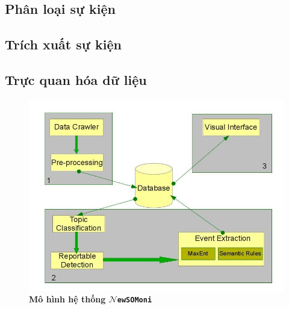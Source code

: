 \subsection{Phân loại sự kiện}
\label{classifi}

\subsection{Trích xuất sự kiện}
\label{ee}


\subsection{Trực quan hóa dữ liệu}
\label{vi}








\begin{figure}[htbp]
		\centering
		\includegraphics[width=1\textwidth]{system}
		\caption{\textbf{Mô hình hệ thống  $\mathcal{N}$\texttt{ewSOMoni}}}
		\label{fig:system}
\end{figure}




